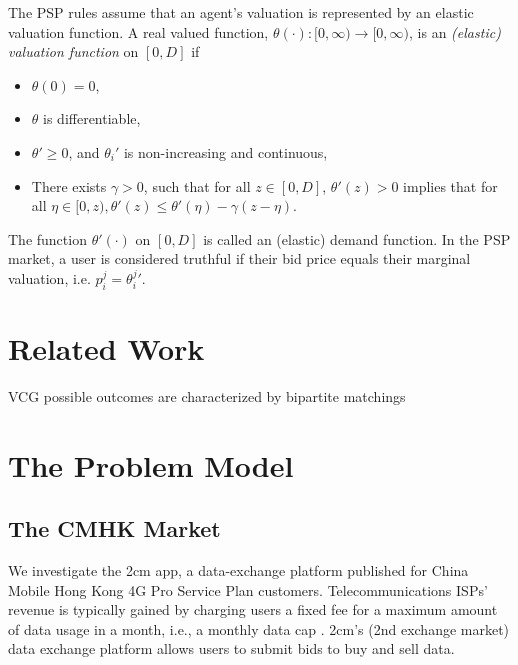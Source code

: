 \documentclass[sigconf, anonymous]{acmart}
\theoremstyle{definition}
\begin{document}
The PSP rules assume that an agent's valuation is represented by an elastic valuation function.
A real valued function, $\theta(\cdot): [0,\infty) \rightarrow [0,\infty)$, is an \emph{(elastic) valuation
function} on $[0, D]$ if 
\begin{itemize}
    \item $\theta(0) = 0$,
    \item $\theta$ is differentiable,
    \item ${\theta}' \ge 0$, and ${\theta_i}'$ is non-increasing and continuous,
     \item There exists $\gamma > 0$, such that for all $z \in [0,D]$,
${\theta}'(z) > 0$ implies that for all $\eta \in [0, z), {\theta}'(z) \le
{\theta}'(\eta)
- \gamma(z - \eta)$. 
\end{itemize}
The function $\theta'(\cdot)$ on $[0, D]$ is called an (elastic) demand
function.
In the PSP market, a
user is considered truthful if their bid price equals their marginal valuation,
i.e. $p_i^j = {\theta_i^j}'$.

\section{Related Work}

VCG possible outcomes are characterized by bipartite matchings

\section{The Problem Model}

\subsection{The CMHK Market}

We investigate the 2cm app, a data-exchange platform published for China Mobile Hong
Kong 4G Pro Service Plan customers. Telecommunications ISPs' revenue is typically
gained by charging users a fixed fee for a maximum amount
of data usage in a month, i.e., a monthly data cap \cite{???}. 
2cm's (2nd exchange market) data exchange platform allows users to submit
bids to buy and sell data.
\end{document}
